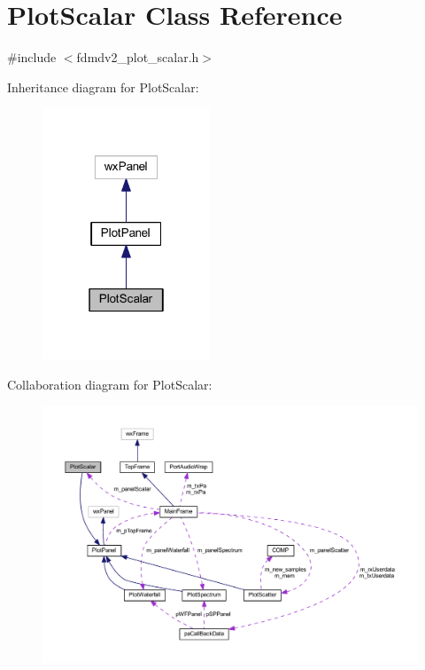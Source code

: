 \hypertarget{class_plot_scalar}{\section{Plot\-Scalar Class Reference}
\label{class_plot_scalar}
}


{\ttfamily \#include $<$fdmdv2\-\_\-plot\-\_\-scalar.\-h$>$}



Inheritance diagram for Plot\-Scalar\-:\nopagebreak
\begin{figure}[H]
\begin{center}
\leavevmode
\includegraphics[width=142pt]{class_plot_scalar__inherit__graph}
\end{center}
\end{figure}


Collaboration diagram for Plot\-Scalar\-:
\nopagebreak
\begin{figure}[H]
\begin{center}
\leavevmode
\includegraphics[width=350pt]{class_plot_scalar__coll__graph}
\end{center}
\end{figure}
